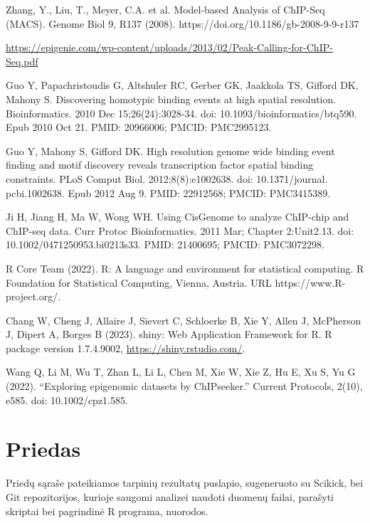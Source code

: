 \documentclass[12pt]{article}
\begin{document}
\begin{thebibliography}{99}
 Zhang, Y., Liu, T., Meyer, C.A. et al. Model-based Analysis
of ChIP-Seq (MACS). Genome Biol 9, R137 (2008).
https://doi.org/10.1186/gb-2008-9-9-r137

 \url{https://epigenie.com/wp-content/uploads/2013/02/Peak-Calling-for-ChIP-Seq.pdf}

 Guo Y, Papachristoudis G, Altshuler RC, Gerber GK, Jaakkola
TS, Gifford DK, Mahony S. Discovering homotypic binding events at high spatial
resolution. Bioinformatics. 2010 Dec 15;26(24):3028-34.
doi: 10.1093/bioinformatics/btq590. Epub 2010 Oct 21. PMID: 20966006;
PMCID: PMC2995123.

 Guo Y, Mahony S, Gifford DK. High resolution genome wide
binding event finding and motif discovery reveals transcription factor spatial
binding constraints. PLoS Comput Biol. 2012;8(8):e1002638. doi: 10.1371/journal.
pcbi.1002638. Epub 2012 Aug 9. PMID: 22912568; PMCID: PMC3415389.

 Ji H, Jiang H, Ma W, Wong WH. Using CisGenome to analyze
ChIP-chip and ChIP-seq data. Curr Protoc Bioinformatics. 2011 Mar;
Chapter 2:Unit2.13. doi: 10.1002/0471250953.bi0213s33. PMID: 21400695;
PMCID: PMC3072298.

 R Core Team (2022). R: A language and environment for statistical
computing. R Foundation for Statistical Computing, Vienna, Austria. URL
https://www.R-project.org/.

 Chang W, Cheng J, Allaire J, Sievert C, Schloerke B, Xie Y,
Allen J, McPherson J, Dipert A, Borges B (2023). shiny: Web Application
Framework for R. R package version 1.7.4.9002, \url{https://shiny.rstudio.com/}.

 Wang Q, Li M, Wu T, Zhan L, Li L, Chen M, Xie W, Xie Z,
Hu E, Xu S, Yu G (2022). “Exploring epigenomic datasets by ChIPseeker.”
Current Protocols, 2(10), e585. doi: 10.1002/cpz1.585.

\end{thebibliography}
\newpage


\section{Priedas} \label{Priedas}

Priedų sąraše pateikiamos tarpinių rezultatų puslapio, sugeneruoto su Scikick,
bei Git repozitorijos, kurioje saugomi analizei naudoti duomenų failai,
parašyti skriptai bei pagrindinė R programa, nuorodos.
\end{document}
